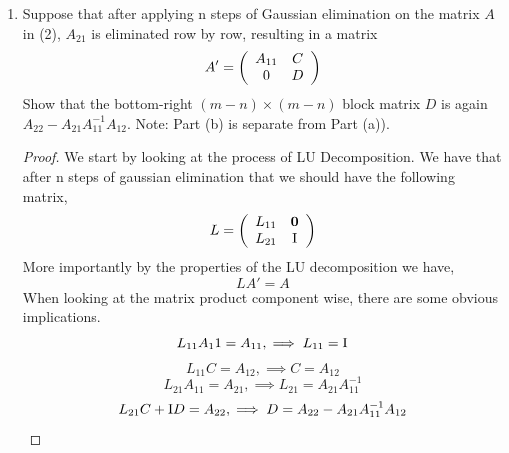 \documentclass{article}
\begin{document}
\begin{enumerate}
\begin{enumerate}
\begin{proof}

\[
 \left(\begin{array}{c c}
        \I & 0\\
        -A_{21}A_{11}^{-1} & \I
    \end{array}\right)
 \left(\begin{array}{c c}
        A_{11} & A_{12}\\
        A_{21} & A_{22}
    \end{array}\right) =  \left(\begin{array}{c c}
        \I A_{11} & \I A_{12}\\
        \I A_{21} - A_{21}A_{11}^{-1}A_{11} & \I A_{22} - A_{21}A_{11}^{-1}A_{12}
    \end{array}\right)
\]
\[
    =  \left(\begin{array}{c c}
            A_{11} & A_{12}\\
            A_{21} - A_{21} & A_{22} - A_{21}A_{11}^{-1}A_{12}
        \end{array}\right) =  \left(\begin{array}{c c}
            A_{11} & A_{12}\\
            0  & A_{22} - A_{21}A_{11}^{-1}A_{12}
        \end{array}\right) 
\]

\end{proof}

\item Suppose that after applying n steps of Gaussian elimination on the
matrix $A$ in (2), $A_{21}$ is eliminated row by row, resulting in a matrix
\[
    A' = \left(\begin{array}{c c}
        A_{11} & C\\
        0 & D
    \end{array}\right)
\]
Show that the bottom-right $(m -n)\times(m-n)$ block matrix $D$ is
again $A_{22} - A_{21}A_{11}^{-1}A_{12}$. Note: Part (b) is separate from Part (a)).
\begin{proof}
We start by looking at the process of LU Decomposition. We have that after n steps of gaussian elimination that we should have the following matrix, 
\[
    L = \left(\begin{array}{c c}
            L_{11} & \textbf{0} \\
            L_{21} & \mathrm{I} \\
            \end{array}\right)
\]
More importantly by the properties of the LU decomposition we have, 
\[
    LA' = A
\]
When looking at the matrix product component wise, there are some obvious implications. 
\[
    L_{11} A_11 = A_{11}, \implies L_{11} = \mathrm{I}
\]
\[
    L_{11} C = A_{12}, \implies C = A_{12}
\]
\[
    L_{21} A_{11} = A_{21}, \implies L_{21} = A_{21}A_{11}^{-1}
\]
\[
    L_{21}C + \mathrm{I} D = A_{22}, \implies D = A_{22} - A_{21}A_{11}^{-1}A_{12}
\]



\end{proof}
\end{enumerate}
\end{enumerate}
\end{document}
